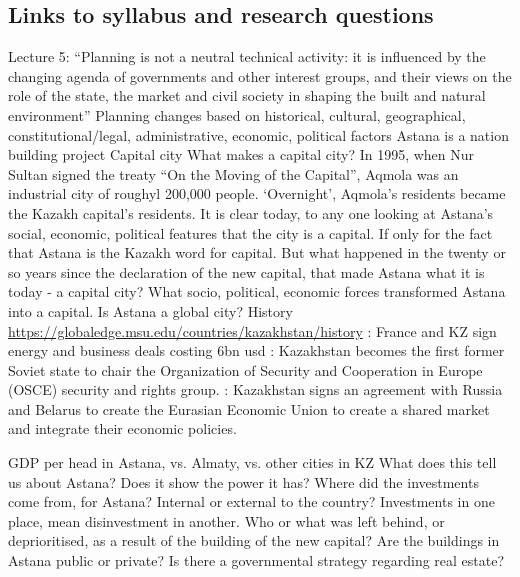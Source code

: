 \documentclass{article}
\begin{document}
\subsection{Links to syllabus and research questions}

\begin{outline}
	\1 Lecture 5: ``Planning is not a neutral technical activity: it is influenced by the changing agenda of governments and other interest groups, and their views on the role of the state, the market and civil society in shaping the built and natural environment''
		\2 Planning changes based on historical, cultural, geographical, constitutional/legal, administrative, economic, political factors
	\1 Astana is a nation building project
	\1 Capital city
		\2 What makes a capital city? In 1995, when Nur Sultan signed the treaty ``On the Moving of the Capital'', Aqmola was an industrial city of roughyl 200,000 people. `Overnight', Aqmola's residents became the Kazakh capital's residents. 
		\2 It is clear today, to any one looking at Astana's social, economic, political features that the city is a capital. If only for the fact that Astana is the Kazakh word for capital. But what happened in the twenty or so years since the declaration of the new capital, that made Astana what it is today - a capital city?
		\2 What socio, political, economic forces transformed Astana into a capital. Is Astana a global city?
	\1 History \url{https://globaledge.msu.edu/countries/kazakhstan/history}
		: France and KZ sign energy and business deals costing 6bn usd
		: Kazakhstan becomes the first former Soviet state to chair the Organization of Security and Cooperation in Europe (OSCE) security and rights group.
		: Kazakhstan signs an agreement with Russia and Belarus to create the Eurasian Economic Union to create a shared market and integrate their economic policies. 
\end{outline}


\begin{outline}
	\1 GDP per head in Astana, vs. Almaty, vs. other cities in KZ
		\2 What does this tell us about Astana? Does it show the power it has?
	\1 Where did the investments come from, for Astana? Internal or external to the country?
		\2 Investments in one place, mean disinvestment in another. Who or what was left behind, or deprioritised, as a result of the building of the new capital?
	\1 Are the buildings in Astana public or private?
		\2 Is there a governmental strategy regarding real estate?
\end{outline}
\end{document}
